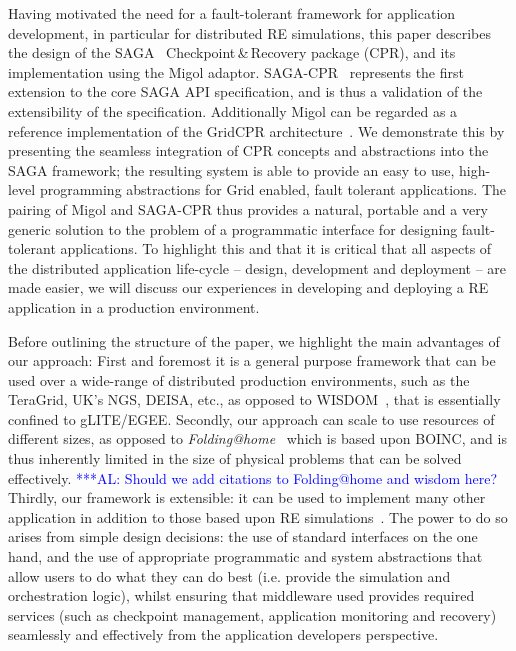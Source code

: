 \documentclass{rspublic}
\newcommand{\alnote}[1]{ {\textcolor{blue} { ***AL: #1 }}}
\newcommand{\alnote}[1]{}
\begin{document}
Having motivated the need for a fault-tolerant framework for
application development, in particular for distributed RE simulations,
this paper describes the design of the SAGA~\cite{saga_gfd90}
Checkpoint\,\&\,Recovery package (CPR), and its implementation using
the Migol adaptor. SAGA-CPR~\cite{saga-cpr} represents the first
extension to the core SAGA API specification, and is thus a validation
of the extensibility of the specification.  Additionally Migol 
can be regarded as a reference implementation of the GridCPR
architecture~\cite{ogf_cpr_arch}. %
We demonstrate this by presenting the seamless integration of CPR
concepts and abstractions into the SAGA framework; the resulting
system is able to provide an easy to use, high-level programming
abstractions for Grid enabled, fault tolerant applications.  The
pairing of Migol and SAGA-CPR thus provides a natural, portable and a
very generic solution to the problem of a programmatic interface for
designing fault-tolerant applications.  To highlight this and that it
is critical that all aspects of the distributed application life-cycle
-- design, development and deployment -- are made easier, we will
discuss our experiences in developing and deploying a RE application
in a production environment.


Before outlining the structure of the paper, we highlight the main
advantages of our approach: First and foremost it is a general purpose
framework that can be used over a wide-range of distributed production
environments, such as the TeraGrid, UK's NGS, DEISA, etc., as opposed
to WISDOM~\cite{wisdom}, that is essentially confined to
gLITE/EGEE. Secondly, our approach can scale to use resources of
different sizes, as opposed to {\it Folding@home}~\cite{folding} which
is based upon BOINC, and is thus inherently limited in the size of
physical problems that can be solved effectively.  \alnote{Should we
  add citations to Folding@home and wisdom here?}  Thirdly, our
framework is extensible: it can be used to implement many other
application in addition to those based upon RE
simulations~\cite{escience07}. The power to do so arises
from simple design decisions: the use of standard interfaces on the
one hand, and the use of appropriate programmatic and system
abstractions that allow users to do what they can do best
(i.e. provide the simulation and orchestration logic), whilst ensuring
that middleware used provides required services (such as checkpoint
management, application monitoring and recovery) seamlessly and
effectively from the application developers perspective.
\end{document}
